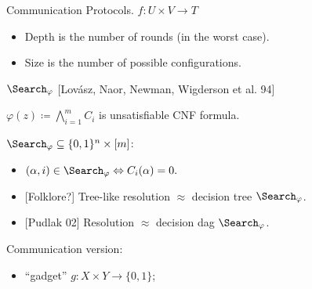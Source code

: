 

\begin{frame}{Communication Protocols. $f\colon U \times V \to T$}
    \begin{center}
    	    
    \end{center}

    \pause
    \pause
    \pause
	\pause

    \begin{itemize}
        \item Depth is the number of rounds (in the worst case).
        \item Size is the number of possible configurations.
    \end{itemize}
\end{frame}

\begin{frame}{$\Search_{\varphi}$ [Lov{\'{a}}sz, Naor, Newman, Wigderson et al. 94]}

    \begin{minipage}{0.48\linewidth}
        $\varphi(z) \coloneqq \bigwedge\limits_{i = 1}^{m} C_i$ is unsatisfiable CNF formula.
        \pause

        $\Search_{\varphi} \subseteq \{0, 1\}^n \times [m]$:
        \begin{itemize}
            \item $(\alpha, i) \in \Search_{\varphi} \Leftrightarrow C_{i}(\alpha) = 0.$
        \end{itemize}
    \end{minipage}
    \begin{minipage}{0.48\linewidth}
        \begin{itemize}
            \item {[Folklore?]} Tree-like resolution $\approx$ decision tree $\Search_{\varphi}$.
            \item {[Pudlak 02]} Resolution $\approx$ decision \alert{dag} $\Search_{\varphi}$.
        \end{itemize}
    \end{minipage}

    \pause
    \vspace{0.4cm}
    Communication version:
    \begin{itemize}
        \item ``gadget'' $g\colon X \times Y \to \{0, 1\}$;
    \end{itemize}

    \pause
    \begin{center}
        
    \end{center}
\end{frame}

